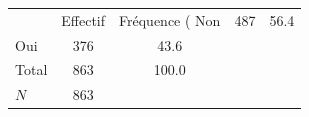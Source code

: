 {
\def\sym#1{\ifmmode^{#1}\else\(^{#1}\)\fi}
\begin{tabular}{l*{1}{cc}}
\toprule
            &    Effectif&Fréquence (%
\midrule
Non         &         487&        56.4\\
Oui         &         376&        43.6\\
Total       &         863&       100.0\\
\midrule
\(N\)       &         863&            \\
\bottomrule
\end{tabular}
}
